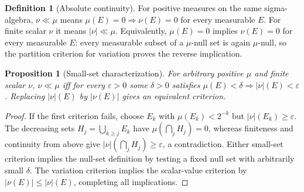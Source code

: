 \documentclass[11pt,oneside,openany]{book}
\newtheorem{proposition}[theorem]{Proposition}
\theoremstyle{definition}
\newtheorem{definition}[theorem]{Definition}
\theoremstyle{remark}
\newcommand{\eps}{\varepsilon}\newcommand{\ee}{\varepsilon}
\newcommand{\family}[1]{}
\begin{document}
\begin{definition}[Absolute continuity]\family{D11.15.absolute_continuity}\label{d11:15:absolute-continuity}
For positive measures on the same sigma-algebra, $\nu\ll\mu$ means
$\mu(E)=0\Rightarrow\nu(E)=0$ for every measurable $E$. For finite scalar
$\nu$ it means $|\nu|\ll\mu$. Equivalently, $\mu(E)=0$ implies
$\nu(E)=0$ for every measurable $E$: every measurable subset of a
$\mu$-null set is again $\mu$-null, so the partition criterion for variation
proves the reverse implication.
\end{definition}

\begin{proposition}[Small-set characterization]\family{D11.15.absolute_continuity_epsilon_delta}\label{d11:15:absolute-continuity-epsilon-delta}
For arbitrary positive $\mu$ and finite scalar $\nu$, $\nu\ll\mu$ iff for
every $\eps>0$ some $\delta>0$ satisfies
$\mu(E)<\delta\Rightarrow|\nu|(E)<\eps$. Replacing $|\nu|(E)$ by
$|\nu(E)|$ gives an equivalent criterion.
\end{proposition}
\begin{proof}
If the first criterion fails, choose $E_k$ with $\mu(E_k)<2^{-k}$ but
$|\nu|(E_k)\geq\eps$. The decreasing sets $H_j=\bigcup_{k\geq j}E_k$
have $\mu(\bigcap_jH_j)=0$, whereas finiteness and continuity from above
give $|\nu|(\bigcap_jH_j)\geq\eps$, a contradiction. Either small-set
criterion implies the null-set definition by testing a fixed null set with
arbitrarily small $\delta$. The variation criterion implies the scalar-value
criterion by $|\nu(E)|\leq|\nu|(E)$, completing all implications.
\end{proof}
\end{document}
